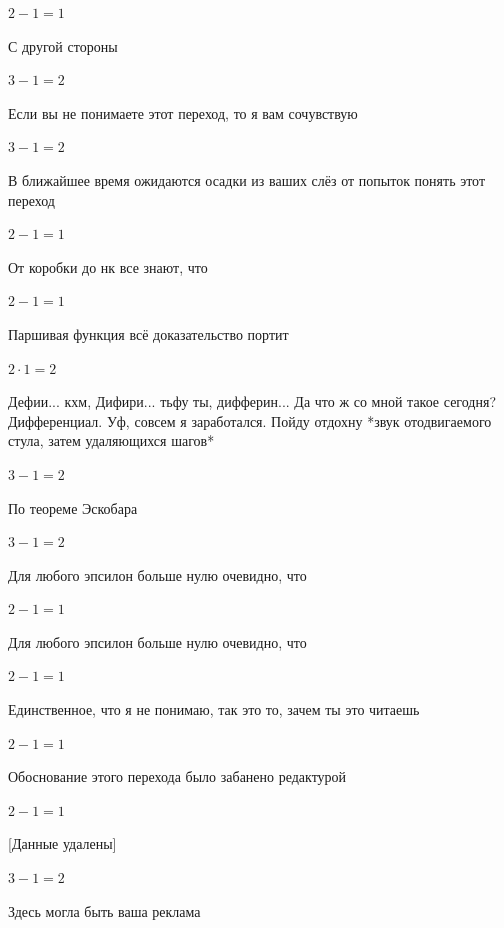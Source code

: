 \documentclass[12pt,a4paper,fleqn]{article}
\begin{document}
\begin{center}$2-1 = 1$\end{center}
С другой стороны

\begin{center}$3-1 = 2$\end{center}
Если вы не понимаете этот переход, то я вам сочувствую

\begin{center}$3-1 = 2$\end{center}
В ближайшее время ожидаются осадки из ваших слёз от попыток понять этот переход

\begin{center}$2-1 = 1$\end{center}
От коробки до нк все знают, что

\begin{center}$2-1 = 1$\end{center}
Паршивая функция всё доказательство портит\cite{link2}

\begin{center}$2 \cdot 1 = 2$\end{center}
Дефии... кхм, Дифири... тьфу ты, дифферин... Да что ж со мной такое сегодня? Дифференциал. Уф, совсем я заработался. Пойду отдохну *звук отодвигаемого стула, затем удаляющихся шагов*

\begin{center}$3-1 = 2$\end{center}
По теореме Эскобара

\begin{center}$3-1 = 2$\end{center}
Для любого эпсилон больше нулю очевидно, что

\begin{center}$2-1 = 1$\end{center}
Для любого эпсилон больше нулю очевидно, что

\begin{center}$2-1 = 1$\end{center}
Единственное, что я не понимаю, так это то, зачем ты это читаешь

\begin{center}$2-1 = 1$\end{center}
Обоснование этого перехода было забанено редактурой

\begin{center}$2-1 = 1$\end{center}
[Данные удалены]

\begin{center}$3-1 = 2$\end{center}
Здесь могла быть ваша реклама
\end{document}
